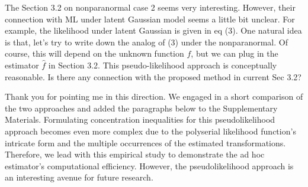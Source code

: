 \begin{point}
    The Section 3.2 on nonparanormal case 2 seems very interesting. However, their connection with ML under latent Gaussian model seems a little bit unclear. For example, the likelihood under latent Gaussian is given in eq (3). One natural idea is that, let's try to write down the analog of (3) under the nonparanormal. Of course, this will depend on the unknown function \(f\), but we can plug in the estimator \(\hat{f}\) in Section 3.2. This pseudo-likelihood approach is conceptually reasonable. Is there any connection with the proposed method in current Sec 3.2?
\end{point}

\begin{reply}
    Thank you for pointing me in this direction. We engaged in a short comparison of the two approaches and added the paragraphs below to the Supplementary Materials. Formulating concentration inequalities for this pseudolikelihood approach becomes even more complex due to the polyserial likelihood function's intricate form and the multiple occurrences of the estimated transformations. Therefore, we lead with this empirical study to demonstrate the ad hoc estimator's computational efficiency. However, the pseudolikelihood approach is an interesting avenue for future research.
\end{reply}

